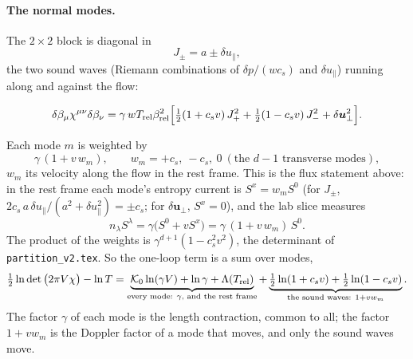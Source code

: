 \documentclass[11pt,aps,preprint,nofootinbib,superscriptaddress,tightenlines]{revtex4-2}
\def\st{\begin{equation}}
\def\stp{\end{equation}}
\let\oldparagraph\paragraph
\renewcommand{\paragraph}{\par\bigskip\oldparagraph}
\begin{document}
\paragraph{The normal modes.}  The $2\times2$ block is diagonal in
\st
J_\pm=a\pm\delta u_\parallel ,
\stp
the two sound waves (Riemann combinations of $\delta p/(wc_s)$ and $\delta u_\parallel$) running along and against the flow:
\begin{keyeq}
\st
\delta\beta_\mu\chi^{\mu\nu}\delta\beta_\nu=\gamma\,wT_{\rm rel}\beta_{\rm rel}^2\Big[\tfrac12(1+c_sv)\,J_+^2+\tfrac12(1-c_sv)\,J_-^2+\delta\bm u_\perp^2\Big] .
\label{modesform}
\stp
\end{keyeq}
Each mode $m$ is weighted by
\st
\gamma\,(1+v\,w_m),\qquad w_m=+c_s,\ -c_s,\ 0\ (\text{the }d-1\text{ transverse modes}),
\stp
$w_m$ its velocity along the flow in the rest frame.  This is the flux statement above: in the rest frame each mode's entropy current is $S^x=w_mS^0$ (for $J_\pm$,
$2c_s\,a\,\delta u_\parallel/(a^2+\delta u_\parallel^2)=\pm c_s$; for $\delta\bm u_\perp$, $S^x=0$), and the lab slice measures
\st
n_\lambda S^\lambda=\gamma\big(S^0+vS^x\big)=\gamma\,(1+v\,w_m)\,S^0 .
\stp
The product of the weights is $\gamma^{d+1}(1-c_s^2v^2)$, the determinant of \nolinkurl{partition_v2.tex}.  So the one-loop term is a sum over modes,
\st
\tfrac12\ln\det\big(2\pi V\chi\big)-\ln T=\underbrace{\mathcal K_0\ln(\gamma V)+\ln\gamma+\Lambda(T_{\rm rel})}_{\text{every mode: }\gamma\text{, and the rest frame}}
+\underbrace{\tfrac12\ln(1+c_sv)+\tfrac12\ln(1-c_sv)}_{\text{the sound waves: }1+vw_m} .
\stp
The factor $\gamma$ of each mode is the length contraction, common to all; the factor $1+vw_m$ is the Doppler factor of a mode that moves, and only the sound waves move.
\end{document}
